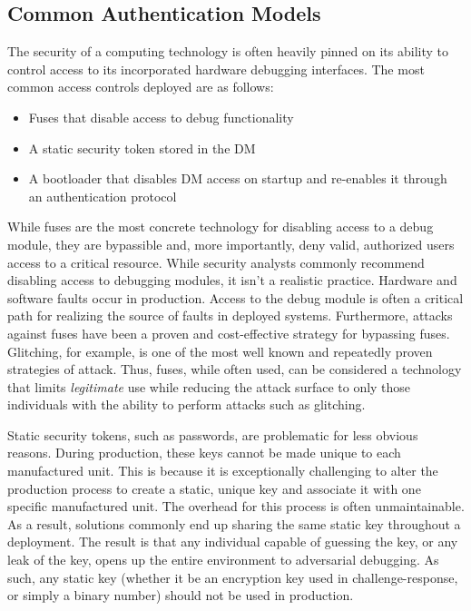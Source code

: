 \subsection{Common Authentication Models}
The security of a computing technology is often heavily pinned on its ability to control access to its incorporated hardware debugging interfaces. The most common access controls deployed are as follows:
\begin{itemize}
    \item Fuses that disable access to debug functionality
    \item A static security token stored in the DM
    \item A bootloader that disables DM access on startup and re-enables it through an authentication protocol
\end{itemize}

While fuses are the most concrete technology for disabling access to a debug module, they are bypassible and, more importantly, deny valid, authorized users access to a critical resource. While security analysts commonly recommend disabling access to debugging modules, it isn't a realistic practice. Hardware and software faults occur in production. Access to the debug module is often a critical path for realizing the source of faults in deployed systems. Furthermore, attacks against fuses have been a proven and cost-effective strategy for bypassing fuses. Glitching, for example, is one of the most well known and repeatedly proven strategies of attack. Thus, fuses, while often used, can be considered a technology that limits {\em legitimate} use while reducing the attack surface to only those individuals with the ability to perform attacks such as glitching. 

Static security tokens, such as passwords, are problematic for less obvious reasons. During production, these keys cannot be made unique to each manufactured unit. This is because it is exceptionally challenging to alter the production process to create a static, unique key and associate it with one specific manufactured unit. The overhead for this process is often unmaintainable. As a result, solutions commonly end up sharing the same static key throughout a deployment. The result is that any individual capable of guessing the key, or any leak of the key, opens up the entire environment to adversarial debugging. As such, any static key (whether it be an encryption key used in challenge-response, or simply a binary number) should not be used in production. 

